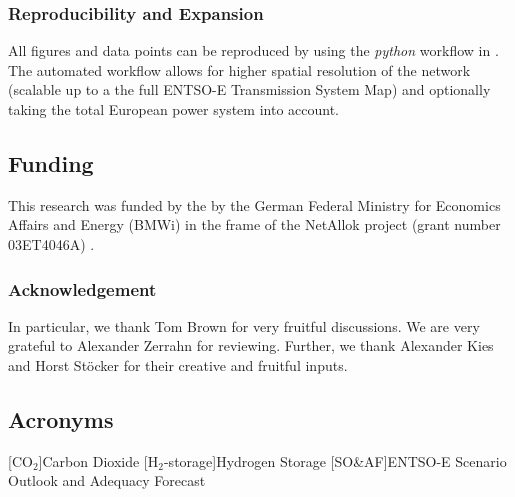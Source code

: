 \documentclass[11pt,twocolumn]{article}
\begin{document}
\subsubsection*{Reproducibility and Expansion}

All figures and data points can be reproduced by using the \textit{python} workflow in \cite{hofmann_pypsa-costallocation_2020}. The automated workflow allows for higher spatial resolution of the network (scalable up to a the full ENTSO-E Transmission System Map) and optionally taking the total European power system into account.  

\subsection*{Funding}
This research was funded by the by the German Federal Ministry for Economics Affairs and Energy (BMWi) in
the frame of the NetAllok project (grant number 03ET4046A) \cite{bundesministerium_fur_wirtschaft_und_energie_verbundvorhaben_nodate}. 

\subsubsection*{Acknowledgement}

In particular, we thank Tom Brown for very fruitful discussions. We are very grateful to Alexander Zerrahn for reviewing. Further, we thank Alexander Kies and Horst Stöcker for their creative and fruitful inputs.




\clearpage
\appendix
\subsection*{Acronyms}
\begin{acronym}[UMLX]
    [CO$_2$]{Carbon Dioxide}
    [H$_2$-storage]{Hydrogen Storage}
    [SO\&AF]{\acs*{ENTSO-E} Scenario Outlook and Adequacy Forecast}
\end{acronym}
\end{document}
